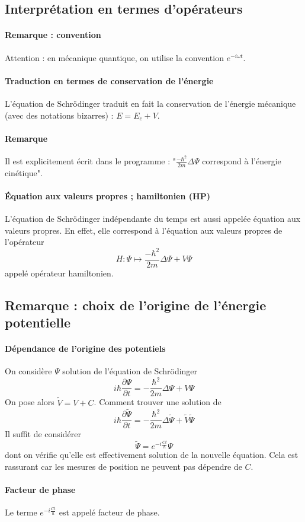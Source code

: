\documentclass[french]{book}
\theoremstyle{plain}
\theoremstyle{definition}
\theoremstyle{remark}
\begin{document}
\subsection{Interprétation en termes d'opérateurs}
\paragraph{Remarque : convention} Attention : en mécanique quantique, on utilise la convention $e^{-i\omega t}$.
\paragraph{Traduction en termes de conservation de l'énergie} L'équation de Schrödinger traduit en fait la conservation de l'énergie mécanique (avec des notations bizarres) : $E=E_c+V$.
\paragraph{Remarque} Il est explicitement écrit dans le programme : "$\displaystyle\frac{-\hbar^2}{2m}\Delta\Psi$ correspond à l'énergie cinétique".
\paragraph{Équation aux valeurs propres ; hamiltonien (HP)} L'équation de Schrödinger indépendante du temps est aussi appelée équation aux valeurs propres. En effet, elle correspond à l'équation aux valeurs propres de l'opérateur $$H:\Psi\mapsto\frac{-\hbar^2}{2m}\Delta\Psi+V\Psi$$ appelé opérateur hamiltonien.
\subsection{Remarque : choix de l'origine de l'énergie potentielle}
\paragraph{Dépendance de l'origine des potentiels} On considère $\Psi$ solution de l'équation de Schrödinger $$i\hbar\frac{\partial\Psi}{\partial t}=-\frac{\hbar^2}{2m}\Delta\Psi+V\Psi$$ On pose alors $\tilde{V}=V+C$. Comment trouver une solution de $$i\hbar\frac{\partial\tilde{\Psi}}{\partial t}=-\frac{\hbar^2}{2m}\Delta\tilde{\Psi}+\tilde{V}\tilde{\Psi}$$ Il suffit de considérer $$\tilde{\Psi}=e^{-i\frac{Ct}{\hbar}}\Psi$$ dont on vérifie qu'elle est effectivement solution de la nouvelle équation. Cela est rassurant car les mesures de position ne peuvent pas dépendre de $C$.
\paragraph{Facteur de phase} Le terme $e^{-i\frac{Ct}{\hbar}}$ est appelé facteur de phase.
\end{document}
